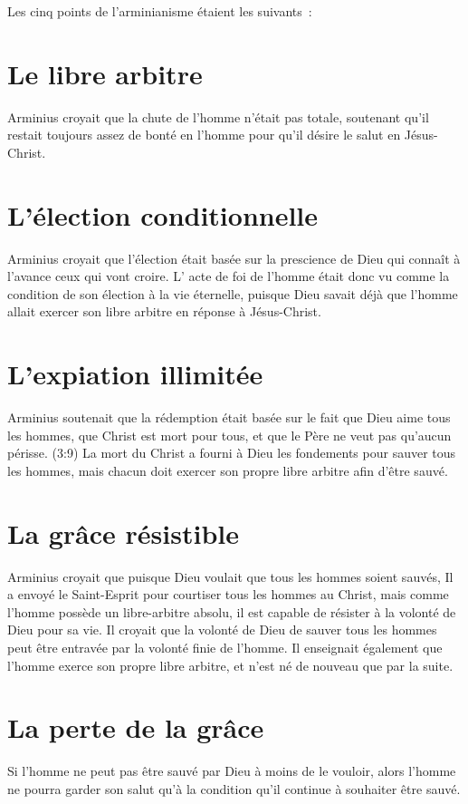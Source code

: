 
Les \og cinq points de l'arminianisme \fg{}
 étaient les suivants~:

\section*{Le libre arbitre}

Arminius croyait que la chute de
 l'homme n'était pas totale,
 soute\-nant qu'il restait toujours assez de bonté en l'homme
 pour qu'il désire le salut en Jésus-Christ.

\section*{L'élection conditionnelle}

Arminius croyait que l'élection
 était basée sur la prescience
 de Dieu qui connaît à l'avance ceux qui vont croire.
 L' \og acte de foi \fg{} de l'homme était donc vu comme la \og condition \fg{} 
 de son élection à la vie éternelle, puisque Dieu savait déjà
 que l'homme allait exercer son \og libre arbitre \fg{}
 en réponse à Jésus-Christ.

\section*{L'expiation illimitée}

Arminius soutenait que la rédemption était basée sur le fait
 que Dieu aime tous les hom\-mes, que Christ est mort pour tous,
 et que le Père ne veut pas qu'aucun périsse.
 (3:9)
 La mort du Christ a fourni à Dieu les fondements
 pour sauver tous les
 hommes, mais chacun doit exercer son propre
 \og libre arbitre \fg{} afin
 d'être sauvé.

\section*{La grâce résistible}

Arminius croyait que puisque Dieu voulait que tous les hommes soient sauvés,
 Il a envoyé le Saint-Esprit pour \og courtiser \fg{}
 tous les hommes au Christ,
 mais comme l'homme
 possède un \og libre-arbitre \fg{} absolu, il est capable de résister
 à la volonté de Dieu pour sa vie.
 Il croyait que la volonté de Dieu de sauver tous les hommes peut être
 entravée par la volonté finie de l'homme.
 Il enseignait également que l'homme exerce son propre libre arbitre,
 et n'est né de nouveau que par la suite.

\section*{La perte de la grâce}

Si l'homme ne peut pas être sauvé par Dieu à moins de le vouloir,
 alors l'homme ne pourra garder son salut qu'à la condition
 qu'il continue à souhaiter être sauvé.




